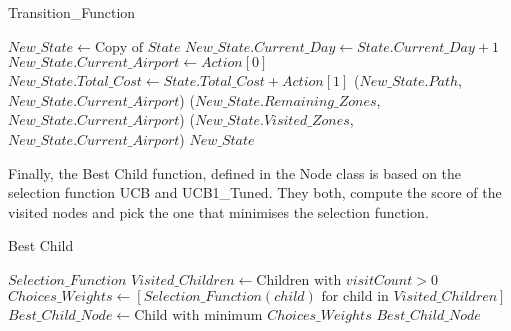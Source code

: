\begin{algorithm}[H]
    \caption{Transition\_Function}
    \label{alg:TransitionFunction}
    \begin{algorithmic}[1]
        \STATE $New\_State \leftarrow \text{Copy of } State$
        \STATE $New\_State.Current\_Day \leftarrow State.Current\_Day + 1$
        \STATE $New\_State.Current\_Airport \leftarrow Action[0]$
        \STATE $New\_State.Total\_Cost \leftarrow State.Total\_Cost + Action[1]$
        \STATE {}($New\_State.Path$, $New\_State.Current\_Airport$)
        \STATE {}($New\_State.Remaining\_Zones$, $New\_State.Current\_Airport$)
        \STATE {}($New\_State.Visited\_Zones$, $New\_State.Current\_Airport$)
        \RETURN $New\_State$
    \end{algorithmic}
\end{algorithm}

Finally, the Best Child function, defined in the Node class is based on the selection function UCB and UCB1\_Tuned. They both, compute the score of the visited nodes and pick the one that minimises the selection function.

\begin{algorithm}[H]
    \caption{Best Child}
    \label{alg:Best Child}
    \begin{algorithmic}[1]
        \REQUIRE $Selection\_Function$
        \STATE $Visited\_Children \leftarrow \text{Children with } visitCount > 0$
        \STATE $Choices\_Weights \leftarrow \left[ Selection\_Function(child) \text{ for child in } Visited\_Children \right]$
        \STATE $Best\_Child\_Node \leftarrow \text{Child with minimum } Choices\_Weights$
        \RETURN $Best\_Child\_Node$
    \end{algorithmic}
\end{algorithm}